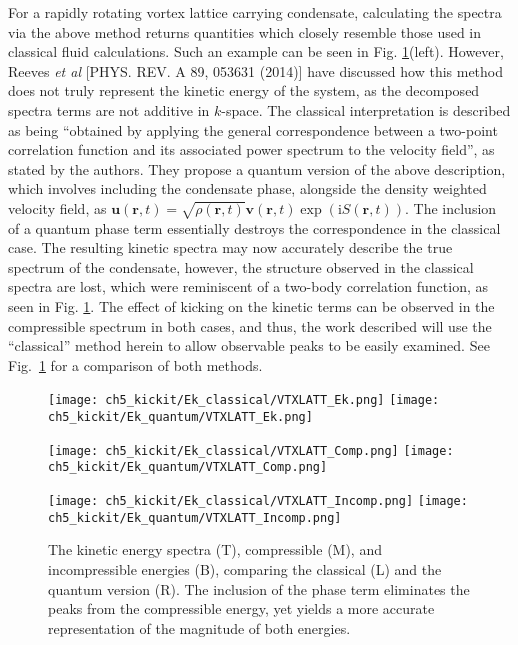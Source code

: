 For a rapidly rotating vortex lattice carrying condensate, calculating the spectra via the above method returns quantities which closely resemble those used in classical fluid calculations. Such an example can be seen in Fig. \ref{fig:ek_clvqu}(left). However, Reeves {\it et al} [PHYS. REV. A 89, 053631 (2014)] have discussed how this method does not truly represent the kinetic energy of the system, as the decomposed spectra terms are not additive in $k$-space. The classical interpretation is described as being ``obtained by applying the general correspondence between a two-point correlation function and its associated
power spectrum to the velocity field'', as stated by the authors. They propose a quantum version of the above description, which involves including the condensate phase, alongside the density weighted velocity field, as $\mathbf{u}(\mathbf{r},t) = \sqrt{\rho(\mathbf{r},t)}\mathbf{v}(\mathbf{r},t)\exp\left(\textrm{i}S(\mathbf{r},t)\right)$. The inclusion of a quantum phase term essentially destroys the correspondence in the classical case. The resulting kinetic spectra may now accurately describe the true spectrum of the condensate, however, the structure observed in the classical spectra are lost, which were reminiscent of a two-body correlation function, as seen in Fig. \ref{fig:ek_clvqu}. The effect of kicking on the kinetic terms can be observed in the compressible spectrum in both cases, and thus, the work described will use the ``classical'' method herein to allow observable peaks to be easily examined. See Fig.~\ref{fig:ek_clvqu} for a comparison of both methods.

\begin{figure}[ht]
    \centering
    \texttt{[image: ch5\_kickit/Ek\_classical/VTXLATT\_Ek.png]}
    \texttt{[image: ch5\_kickit/Ek\_quantum/VTXLATT\_Ek.png]}

    \texttt{[image: ch5\_kickit/Ek\_classical/VTXLATT\_Comp.png]}
    \texttt{[image: ch5\_kickit/Ek\_quantum/VTXLATT\_Comp.png]}

    \texttt{[image: ch5\_kickit/Ek\_classical/VTXLATT\_Incomp.png]}
    \texttt{[image: ch5\_kickit/Ek\_quantum/VTXLATT\_Incomp.png]}

\caption[Kinetic energy spectra with and without quantum phase.]{The kinetic energy spectra (T), compressible (M), and incompressible energies (B), comparing the classical (L) and the quantum version (R). The inclusion of the phase term eliminates the peaks from the compressible energy, yet yields a more accurate representation of the magnitude of both energies.}
\label{fig:ek_clvqu}
\end{figure}



